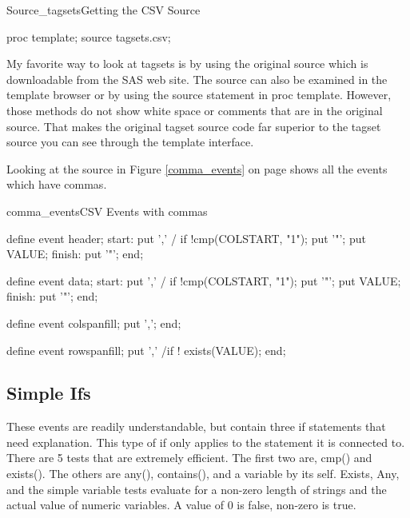 \begin{fvcode}{Source_tagsets}{Getting the CSV Source}

 proc template;
   source tagsets.csv;

\end{fvcode}

My favorite way to look at tagsets is by using the original
source which is downloadable from the SAS web site.  The source
can also be examined in the template browser or by using the
source statement in proc template.  However, those methods do
not show white space or comments that are in the original source.
That makes the original tagset source code far superior to the
tagset source you can see through the template interface.

Looking at the source 
in Figure \ref{comma_events} on page \pageref{comma_events} 
shows all the events which have commas.

\begin{fvcode}{comma_events}{CSV Events with commas}

        define event header;
          start:
            put ',' / if !cmp(COLSTART, "1");
            put '"';
            put VALUE;
          finish:
            put '"';
        end;

        define event data;
          start:
            put ',' / if !cmp(COLSTART, "1");
            put '"';
            put VALUE;
          finish:
            put '"';
        end;

        define event colspanfill;
            put ',';
        end;

        define event rowspanfill;
            put ',' /if ! exists(VALUE);
        end;


\end{fvcode}

\subsection{Simple Ifs}
These events are readily understandable, but contain
three if statements that need explanation.  This type
of if only applies to the statement it is connected
to.  There are 5 tests that are extremely 
efficient.  The first two are, cmp() and exists().
The others are any(), contains(), and a variable by its
self. Exists, Any, and the simple
variable tests evaluate for a non-zero length of strings
and the actual value of numeric variables.  A value of 0 
is false, non-zero is true.

